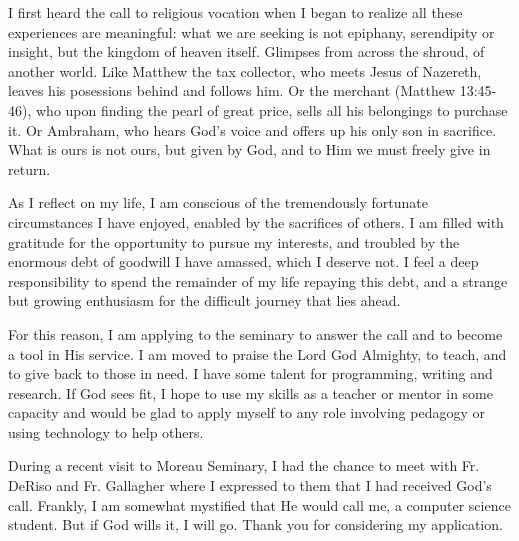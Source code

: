 \documentclass[11pt]{article}
\begin{document}
I first heard the call to religious vocation when I began to realize all these experiences are meaningful: what we are seeking is not epiphany, serendipity or insight, but the kingdom of heaven itself. Glimpses from across the shroud, of another world. Like Matthew the tax collector, who meets Jesus of Nazereth, leaves his posessions behind and follows him. Or the merchant (Matthew 13:45-46), who upon finding the pearl of great price, sells all his belongings to purchase it. Or Ambraham, who hears God's voice and offers up his only son in sacrifice. What is ours is not ours, but given by God, and to Him we must freely give in return.

As I reflect on my life, I am conscious of the tremendously fortunate circumstances I have enjoyed, enabled by the sacrifices of others. I am filled with gratitude for the opportunity to pursue my interests, and troubled by the enormous debt of goodwill I have amassed, which I deserve not. I feel a deep responsibility to spend the remainder of my life repaying this debt, and a strange but growing enthusiasm for the difficult journey that lies ahead.

For this reason, I am applying to the seminary to answer the call and to become a tool in His service. I am moved to praise the Lord God Almighty, to teach, and to give back to those in need. I have some talent for programming, writing and research. If God sees fit, I hope to use my skills as a teacher or mentor in some capacity and would be glad to apply myself to any role involving pedagogy or using technology to help others.

During a recent visit to Moreau Seminary, I had the chance to meet with Fr. DeRiso and Fr. Gallagher where I expressed to them that I had received God's call. Frankly, I am somewhat mystified that He would call me, a computer science student. But if God wills it, I will go. Thank you for considering my application.
\end{document}
